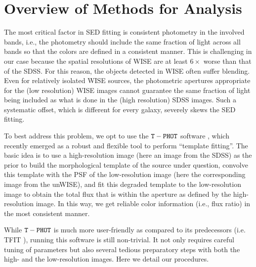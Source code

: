 \documentclass[apj,iop]{emulateapj}
\begin{document}
\section{Overview of Methods for Analysis}

The most critical factor in SED fitting is consistent photometry in the involved bands, i.e., the photometry should include the same fraction of light across all bands so that the colors are defined in a consistent manner. This is challenging in our case because the spatial resolutions of WISE are at least $6\times$ worse than that of the SDSS. For this reason, the objects detected in WISE often suffer blending. Even for relatively isolated WISE sources, the photometric apertures appropriate for the (low resolution) WISE images cannot guarantee the same fraction of light being included as what is done in the (high resolution) SDSS images. Such a systematic offset, which is different for every galaxy, severely skews the SED fitting. 

To best address this problem, we opt to use the $\tt T-PHOT$ software \citep[][]{Merlin2015}, which recently emerged as a robust and flexible tool to perform ``template fitting''. The basic idea is to use a high-resolution image (here an image from the SDSS) as the prior to build the morphological template of the source under question, convolve this template with the PSF of the low-resolution image (here the corresponding image from the unWISE), and fit this degraded template to the low-resolution image to obtain the total flux that is within the aperture as defined by the high-resolution image. In this way, we get reliable color information (i.e., flux ratio) in the most consistent manner. 

While $\tt T-PHOT$ is much more user-friendly as compared to its predecessors (i.e. TFIT \citet[][]{Laidler2007}), running this software is still non-trivial. It not only requires careful tuning of parameters but also several tedious preparatory steps with both the high- and the low-resolution images. Here we detail our procedures.
	
\end{document}
